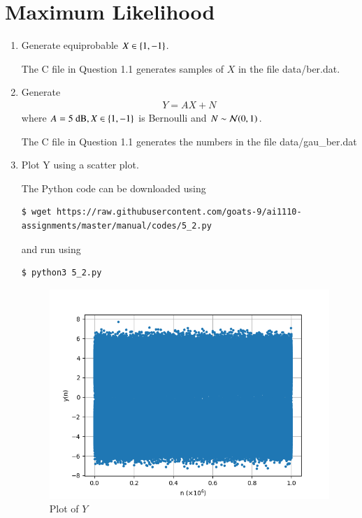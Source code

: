 \documentclass[journal,12pt,twocolumn]{IEEEtran}
\renewcommand\thesection{\arabic{section}}
\begin{document}
\section{Maximum Likelihood}
\begin{enumerate}[label=\thesection.\arabic*
,ref=\thesection.\theenumi]
\item Generate equiprobable $X \in \left\{1, -1\right\}$.

\solution
The C file in Question 1.1 generates samples of $X$ in the file data/ber.dat.

\item Generate 
	\begin{align}
		Y = AX + N
	\end{align}
where $A  = 5 \text{ dB}, X \in \left\{1, -1\right\}$ is Bernoulli and $N \sim \mathcal{N}(0, 1)$.

\solution
The C file in Question 1.1 generates the numbers in the file data/gau\_ber.dat
\item Plot Y using a scatter plot.

\solution
The Python code can be downloaded using
\begin{lstlisting}
$ wget https://raw.githubusercontent.com/goats-9/ai1110-assignments/master/manual/codes/5_2.py
\end{lstlisting}
and run using
\begin{lstlisting}
$ python3 5_2.py
\end{lstlisting}
\begin{figure}[!htb]
	\includegraphics[width=\columnwidth]{figs/5_2.png}
	\caption{Plot of $Y$}
	\label{fig:wave}
\end{figure}


\end{enumerate}
\end{document}
